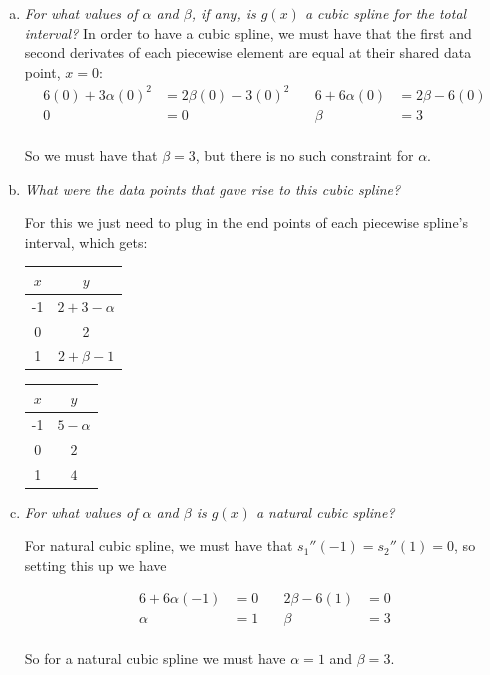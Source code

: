 \documentclass{article}
\begin{document}
\begin{enumerate}[(a)]
  \item \textit{For what values of $\alpha$ and $\beta$, if any, is $g(x)$ a cubic spline for the total interval?}
    In order to have a cubic spline, we must have that the first and second derivates of each piecewise element are equal at their shared data point, $x = 0$:
    \begin{align*}
      6(0) + 3\alpha (0)^2 &= 2\beta (0) - 3(0)^2 &\quad 6 + 6\alpha (0) &= 2\beta - 6(0) \\
      0 &= 0 &\quad \beta &= 3 \\
    \end{align*}

    So we must have that $\beta = 3$, but there is no such constraint for $\alpha$.

  \item \textit{What were the data points that gave rise to this cubic spline?}

    For this we just need to plug in the end points of each piecewise spline's interval, which gets:

    \begin{table}[h!]
      \centering
      \begin{tabular}{c | c}
        $x$ & $y$ \\ [0.5ex] \hline
        -1 & $2 + 3 - \alpha$ \\
        0 & 2 \\
        1 & $2 + \beta - 1$
      \end{tabular}
    \end{table}
    \begin{table}[h!]
      \centering
      \begin{tabular}{c | c}
        $x$ & $y$ \\ [0.5ex] \hline
        -1 & $5 - \alpha$ \\
        0 & $2$ \\
        1 & $4$
      \end{tabular}
    \end{table}
  \item \textit{For what values of $\alpha$ and $\beta$ is $g(x)$ a natural cubic spline?}

    For natural cubic spline, we must have that $s_1''(-1) = s_2''(1) = 0$, so setting this up we have

    \begin{align*}
      6 + 6\alpha (-1) &= 0 &\quad 2\beta - 6(1) &= 0 \\
      \alpha &= 1 &\quad \beta &= 3 \\
    \end{align*}

    So for a natural cubic spline we must have $\alpha = 1$ and $\beta = 3$.
\end{enumerate}
\end{document}
